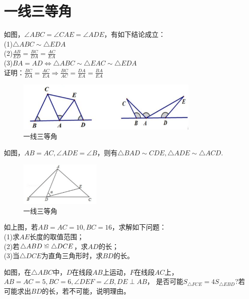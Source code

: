 \documentclass{ecnuthesis}
\newcommand\backcong{\mathrel{\reflectbox{$\cong$}}}
\begin{document}
\section{一线三等角}
\begin{model}
    如图，$\angle ABC=\angle CAE=\angle ADE$，有如下结论成立：\\
    (1)$\triangle ABC\sim \triangle EDA$ \\
    (2)$\frac{AB}{ED}=\frac{BC}{DA}=\frac{AC}{EA}$ \\
    (3)$BA=AD \Leftrightarrow \triangle ABC \sim \triangle EAC \sim \triangle EDA$ \\
    证明：$\frac{BC}{DA}=\frac{AC}{EA}\Rightarrow \frac{BC}{AC}=\frac{DA}{EA}=\frac{BA}{EA}$
\end{model}
\begin{figure}[H]
\centering
\includegraphics[width=9cm]{picture/858.png}
\caption{一线三等角}
\end{figure}
\begin{model}
    如图，$AB=AC,\angle ADE=\angle B$，则有$\triangle BAD \sim CDE,\triangle ADE \sim \triangle ACD.$
\end{model}
\begin{figure}[H]
\centering
\includegraphics[width=4cm]{picture/831.png}
\caption{一线三等角}
\end{figure}
\begin{problem}
    如上图，若$AB=AC=10,BC=16$，求解如下问题：\\
    (1)求$AE$长度的取值范围；\\
    (2)若$\triangle ABD \backcong \triangle DCE$，求$AD$的长；\\
    (3)当$\triangle DCE$为直角三角形时，求$BD$的长。
\end{problem}
\begin{problem}
    如图，在$\triangle ABC$中，$D$在线段$AB$上运动，$F$在线段$AC$上，$AB=AC=5,BC=6,\angle DEF=\angle B,DE\perp AB$，
    是否可能$S_{\triangle FCE}=4S_{\triangle EBD}$?若可能求出$BD$的长，若不可能，说明理由。
\end{problem}
\end{document}
